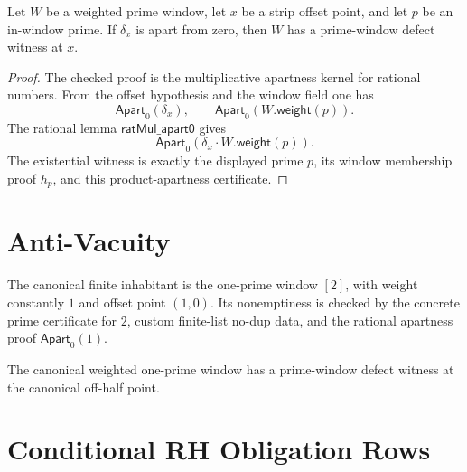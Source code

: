 \begin{theorem}
\label{thm:rh-off-half-prime-window-defect}
Let $W$ be a weighted prime window, let $x$ be a strip offset point, and
let $p$ be an in-window prime. If $\delta_x$ is apart from zero, then
$W$ has a prime-window defect witness at $x$.
\end{theorem}

\begin{proof}
The checked proof is the multiplicative apartness kernel for rational
numbers. From the offset hypothesis and the window field one has
$$
\mathsf{Apart}_0(\delta_x),
\qquad
\mathsf{Apart}_0(W.\mathsf{weight}(p)).
$$
The rational lemma $\mathsf{ratMul\_apart0}$ gives
$$
\mathsf{Apart}_0(\delta_x\cdot W.\mathsf{weight}(p)).
$$
The existential witness is exactly the displayed prime $p$, its window
membership proof $h_p$, and this product-apartness certificate.
\end{proof}

\section{Anti-Vacuity}
\label{sec:rh-prime-window-defect-anti-vacuity}

\begin{definition}
\label{def:rh-prime-window-defect-canonical}
The canonical finite inhabitant is the one-prime window $[2]$, with
weight constantly $1$ and offset point $(1,0)$. Its nonemptiness is
checked by the concrete prime certificate for $2$, custom finite-list
no-dup data, and the rational apartness proof
$\mathsf{Apart}_0(1)$.
\end{definition}

\begin{theorem}
\label{thm:rh-canonical-prime-window-defect}
The canonical weighted one-prime window has a prime-window defect witness
at the canonical off-half point.
\end{theorem}

\section{Conditional RH Obligation Rows}
\label{sec:rh-prime-window-defect-obligations}


